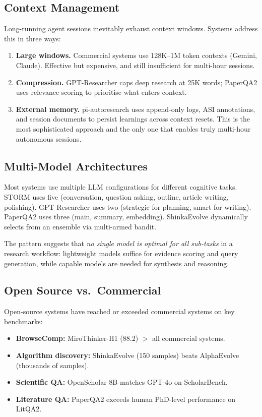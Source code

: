 \documentclass[11pt,a4paper]{article}
\begin{document}
\subsection{Context Management}

Long-running agent sessions inevitably exhaust context windows. Systems
address this in three ways:

\begin{enumerate}[nosep]
  \item \textbf{Large windows.} Commercial systems use 128K--1M token
    contexts (Gemini, Claude). Effective but expensive, and still
    insufficient for multi-hour sessions.
  \item \textbf{Compression.} GPT-Researcher caps deep research at
    25K words; PaperQA2 uses relevance scoring to prioritise what enters
    context.
  \item \textbf{External memory.} pi-autoresearch uses append-only logs,
    ASI annotations, and session documents to persist learnings across
    context resets. This is the most sophisticated approach and the only
    one that enables truly multi-hour autonomous sessions.
\end{enumerate}

\subsection{Multi-Model Architectures}

Most systems use multiple LLM configurations for different cognitive
tasks. STORM uses five (conversation, question asking, outline, article
writing, polishing). GPT-Researcher uses two (strategic for planning,
smart for writing). PaperQA2 uses three (main, summary, embedding).
ShinkaEvolve dynamically selects from an ensemble via multi-armed
bandit.

The pattern suggests that \emph{no single model is optimal for all
sub-tasks} in a research workflow: lightweight models suffice for
evidence scoring and query generation, while capable models are needed
for synthesis and reasoning.

\subsection{Open Source vs.\ Commercial}

Open-source systems have reached or exceeded commercial systems on
key benchmarks:

\begin{itemize}[nosep]
  \item \textbf{BrowseComp:} MiroThinker-H1 (88.2) $>$ all commercial
    systems.
  \item \textbf{Algorithm discovery:} ShinkaEvolve (150 samples) beats
    AlphaEvolve (thousands of samples).
  \item \textbf{Scientific QA:} OpenScholar 8B matches GPT-4o on
    ScholarBench.
  \item \textbf{Literature QA:} PaperQA2 exceeds human PhD-level
    performance on LitQA2.
\end{itemize}
\end{document}
